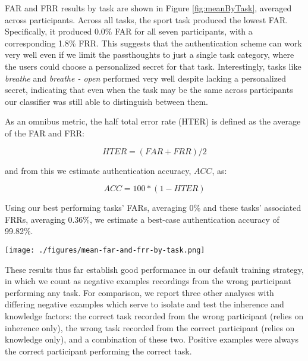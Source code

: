 \documentclass{sigchi}
\begin{document}
FAR and FRR results by task are shown in Figure \ref{fig:meanByTask}, averaged across participants. Across all tasks, the sport task produced the lowest FAR. Specifically, it produced 0.0\% FAR for all seven participants, with a corresponding 1.8\% FRR. This suggests that the authentication scheme can work very well even if we limit the passthoughts to just a single task category, where the users could choose a personalized secret for that task. Interestingly, tasks like \textit{breathe} and \textit{breathe - open} performed very well despite lacking a personalized secret, indicating that even when the task may be the same across participants our classifier was still able to distinguish between them.

As an omnibus metric, the half total error rate (HTER) is defined as the average of the FAR and FRR: 

\[ HTER = (FAR + FRR) / 2 \]

and from this we estimate authentication accuracy, $ACC$, as:

\[ ACC = 100*(1-HTER) \]

Using our best performing tasks' FARs, averaging 0\% and these tasks' associated FRRs, averaging 0.36\%, we estimate a best-case authentication accuracy of 99.82\%.

\begin{figure*}[t]
\centering
\texttt{[image: ./figures/mean-far-and-frr-by-task.png]}
\caption{FAR and FRR results by task, across all subjects, using data from the left ear only.}
\label{fig:meanByTask}
\end{figure*}

These results thus far establish good performance in our default training strategy, in which we count as negative examples recordings from the wrong participant performing any task. For comparison, we report three other analyses with differing negative examples which serve to isolate and test the inherence and knowledge factors: the correct task recorded from the wrong participant (relies on inherence only), the wrong task recorded from the correct participant (relies on knowledge only), and a combination of these two. Positive examples were always the correct participant performing the correct task.
\end{document}
